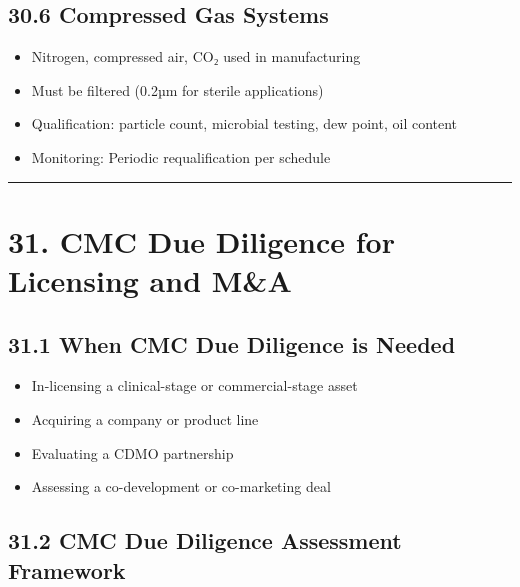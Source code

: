\documentclass[
  11pt,
  a4paper,
]{report}
\providecommand{\tightlist}{%
  \setlength{\itemsep}{0pt}\setlength{\parskip}{0pt}}
\begin{document}
\hypertarget{compressed-gas-systems}{%
\subsection{30.6 Compressed Gas Systems}\label{compressed-gas-systems}}

\begin{itemize}
\tightlist
\item
  Nitrogen, compressed air, CO₂ used in manufacturing
\item
  Must be filtered (0.2µm for sterile applications)
\item
  Qualification: particle count, microbial testing, dew point, oil
  content
\item
  Monitoring: Periodic requalification per schedule
\end{itemize}

\begin{center}\rule{0.5\linewidth}{0.5pt}\end{center}

\hypertarget{cmc-due-diligence-for-licensing-and-ma}{%
\section{31. CMC Due Diligence for Licensing and
M\&A}\label{cmc-due-diligence-for-licensing-and-ma}}

\hypertarget{when-cmc-due-diligence-is-needed}{%
\subsection{31.1 When CMC Due Diligence is
Needed}\label{when-cmc-due-diligence-is-needed}}

\begin{itemize}
\tightlist
\item
  In-licensing a clinical-stage or commercial-stage asset
\item
  Acquiring a company or product line
\item
  Evaluating a CDMO partnership
\item
  Assessing a co-development or co-marketing deal
\end{itemize}

\hypertarget{cmc-due-diligence-assessment-framework}{%
\subsection{31.2 CMC Due Diligence Assessment
Framework}\label{cmc-due-diligence-assessment-framework}}
\end{document}
